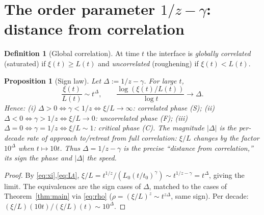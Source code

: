 \documentclass{amsart}
\newtheorem{proposition}{Proposition}
\theoremstyle{definition}
\newtheorem{definition}{Definition}
\newcommand{\asymp}{\sim}
\begin{document}
\section{The order parameter $1/z-\gamma$: distance from correlation}
\label{sec:correlation}

\begin{definition}[Global correlation]\label{def:corr}
At time $t$ the interface is \emph{globally correlated} (saturated) if
$\xi(t)\ge L(t)$ and \emph{uncorrelated} (roughening) if $\xi(t)<L(t)$.
\end{definition}

\begin{proposition}[Sign law]\label{prop:sign}
Let $\Delta:=1/z-\gamma$. For large $t$,
\[
  \frac{\xi(t)}{L(t)}\asymp t^{\Delta},\qquad
  \frac{\log(\xi(t)/L(t))}{\log t}\to\Delta .
\]
Hence: (i) $\Delta>0\iff\gamma<1/z\iff\xi/L\to\infty$: correlated phase (S);
(ii) $\Delta<0\iff\gamma>1/z\iff\xi/L\to0$: uncorrelated phase (F);
(iii) $\Delta=0\iff\gamma=1/z\iff\xi/L\asymp1$: critical phase (C).
The magnitude $|\Delta|$ is the per-decade rate of approach to/retreat from full
correlation: $\xi/L$ changes by the factor $10^{\Delta}$ when $t\mapsto10t$. Thus
$\Delta=1/z-\gamma$ is the precise ``distance from correlation,'' its sign the
phase and $|\Delta|$ the speed.
\end{proposition}
\begin{proof}
By \eqref{eq:xi},\eqref{eq:Lt}, $\xi/L=t^{1/z}/(L_0(t/t_0)^{\gamma})
\asymp t^{1/z-\gamma}=t^{\Delta}$, giving the limit. The equivalences are the sign
cases of $\Delta$, matched to the cases of Theorem~\ref{thm:main} via
\eqref{eq:rho} ($\rho=(\xi/L)^z\asymp t^{z\Delta}$, same sign). Per decade:
$(\xi/L)(10t)\big/(\xi/L)(t)\asymp10^{\Delta}$.
\end{proof}
\end{document}
